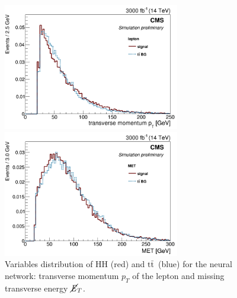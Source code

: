 \documentclass[10pt,a4paper]{article}
\newcommand{\ww}{7.7cm} %
\newcommand{\dd}{-2mm} %
\renewcommand{\tt}{$\text{t}\bar{\text{t}}$}
\newcommand{\MET}{$\cancel{\it{E}}_{T}$}
\begin{document}
\begin{figure}[h]
    \begin{minipage}[h!]{\ww}
      \centering
      \includegraphics[width=\ww]{figs/leptonPt.png}
    \end{minipage}
    \begin{minipage}[h!]{\ww}
      \centering
      \includegraphics[width=\ww]{figs/MET.png}
    \end{minipage}
  \vspace{\dd}
  \caption{Variables distribution of HH (red) and \tt\ (blue) for the neural network: transverse momentum $p_T$ of the lepton and missing transverse energy \MET.} \label{vars1}
\end{figure}
\end{document}
